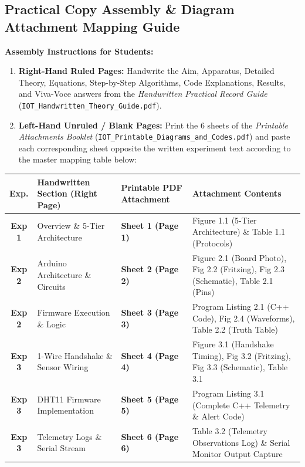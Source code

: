 \documentclass[11pt,a4paper]{article}
\begin{document}
\subsection*{Practical Copy Assembly \& Diagram Attachment Mapping Guide}
\begin{attachmentbox}
\footnotesize
\textbf{Assembly Instructions for Students:}
\begin{enumerate}[noitemsep, leftmargin=*]
    \item \textbf{Right-Hand Ruled Pages:} Handwrite the Aim, Apparatus, Detailed Theory, Equations, Step-by-Step Algorithms, Code Explanations, Results, and Viva-Voce answers from the \textit{Handwritten Practical Record Guide} (\texttt{IOT\_Handwritten\_Theory\_Guide.pdf}).
    \item \textbf{Left-Hand Unruled / Blank Pages:} Print the 6 sheets of the \textit{Printable Attachments Booklet} (\texttt{IOT\_Printable\_Diagrams\_and\_Codes.pdf}) and paste each corresponding sheet opposite the written experiment text according to the master mapping table below:
\end{enumerate}

\vspace{0.1cm}
\renewcommand{\arraystretch}{1.2}
\begin{tabularx}{\linewidth}{|c|p{4.2cm}|p{3.8cm}|X|}
\hline
\textbf{Exp.} & \textbf{Handwritten Section (Right Page)} & \textbf{Printable PDF Attachment} & \textbf{Attachment Contents} \\
\hline
\textbf{Exp 1} & Overview \& 5-Tier Architecture & \textbf{Sheet 1 (Page 1)} & Figure 1.1 (5-Tier Architecture) \& Table 1.1 (Protocols) \\
\textbf{Exp 2} & Arduino Architecture \& Circuits & \textbf{Sheet 2 (Page 2)} & Figure 2.1 (Board Photo), Fig 2.2 (Fritzing), Fig 2.3 (Schematic), Table 2.1 (Pins) \\
\textbf{Exp 2} & Firmware Execution \& Logic & \textbf{Sheet 3 (Page 3)} & Program Listing 2.1 (C++ Code), Fig 2.4 (Waveforms), Table 2.2 (Truth Table) \\
\textbf{Exp 3} & 1-Wire Handshake \& Sensor Wiring & \textbf{Sheet 4 (Page 4)} & Figure 3.1 (Handshake Timing), Fig 3.2 (Fritzing), Fig 3.3 (Schematic), Table 3.1 \\
\textbf{Exp 3} & DHT11 Firmware Implementation & \textbf{Sheet 5 (Page 5)} & Program Listing 3.1 (Complete C++ Telemetry \& Alert Code) \\
\textbf{Exp 3} & Telemetry Logs \& Serial Stream & \textbf{Sheet 6 (Page 6)} & Table 3.2 (Telemetry Observations Log) \& Serial Monitor Output Capture \\
\hline
\end{tabularx}
\end{attachmentbox}
\end{document}
